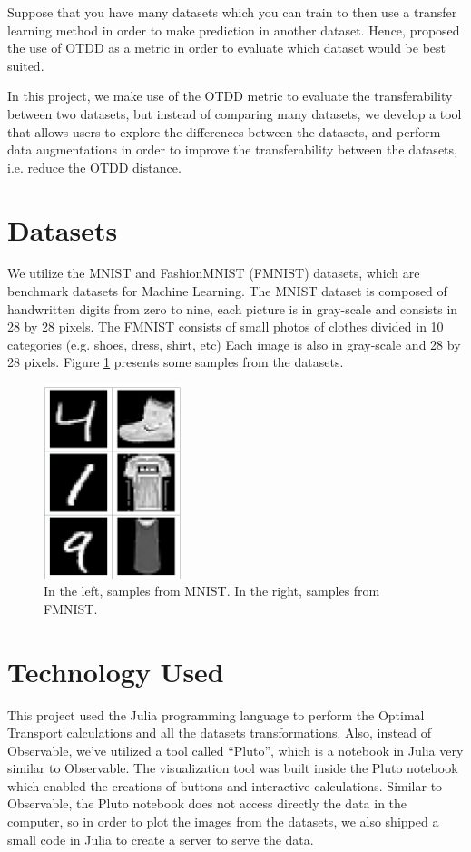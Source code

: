 \documentclass[10pt]{article}
\theoremstyle{definition}
\begin{document}
Suppose that you have many
datasets which you can train to then use a transfer learning method
in order to make prediction in another dataset. Hence,
\citet{alvarez2020geometric} proposed the use of OTDD as a metric
in order to evaluate which dataset would be best suited.

In this project, we make use of the OTDD metric to evaluate
the transferability between two datasets, but instead of
comparing many datasets, we develop a tool that allows users
to explore the differences between the datasets, and perform data
augmentations in order to improve the transferability between the datasets, i.e.
reduce the OTDD distance.

\section{Datasets}

We utilize the MNIST and FashionMNIST (FMNIST) datasets, which are benchmark
datasets for Machine Learning. The MNIST dataset is composed of handwritten
digits from zero to nine, each picture is in gray-scale and consists
in 28 by 28 pixels.
The FMNIST consists of small photos of clothes divided in 10 categories (e.g. shoes, dress, shirt, etc)
Each image is also in gray-scale and 28 by 28 pixels.
Figure \ref{fig:dataset} presents some samples from the datasets.

\begin{figure}[H]
  \centering
  \includegraphics[width=4cm]{Figures/datasets.png}
  \caption{In the left, samples from MNIST. In the right, samples from FMNIST.}
  \label{fig:dataset}
\end{figure}

\section{Technology Used}

This project used the Julia programming language to perform the Optimal Transport
calculations and all the datasets transformations. Also, instead of Observable,
we've utilized a tool called ``Pluto'', which is a notebook in Julia very
similar to Observable. The visualization tool was built inside the Pluto notebook 
which enabled the creations of buttons and interactive calculations.
Similar to Observable, the Pluto notebook does not access directly the data
in the computer, so in order to plot the images from the datasets,
we also shipped a small code in Julia to create a server to serve the data.
\end{document}
